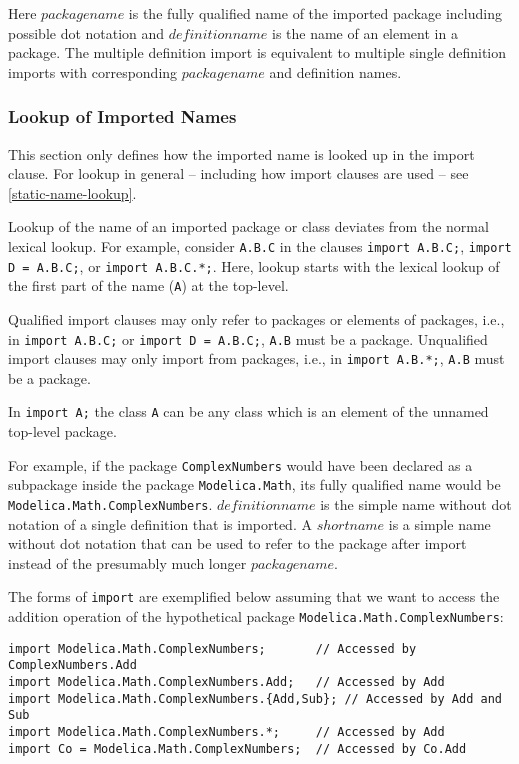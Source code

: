 Here $\mathit{packagename}$ is the fully qualified name of the imported package including possible dot notation and $\mathit{definitionname}$ is the name of an element in a package.  The multiple definition import is equivalent
to multiple single definition imports with corresponding $\mathit{packagename}$ and definition names.

\subsubsection{Lookup of Imported Names}\label{lookup-of-imported-names}

This section only defines how the imported name is looked up in the import clause. For lookup in general -- including how import clauses are used -- see \cref{static-name-lookup}.

Lookup of the name of an imported package or class deviates from the normal lexical lookup.  For example, consider \lstinline!A.B.C! in the clauses \lstinline!import A.B.C;!, \lstinline!import D = A.B.C;!, or \lstinline!import A.B.C.*;!.
Here, lookup starts with the lexical lookup of the first part of the name (\lstinline!A!) at the top-level.

Qualified import clauses may only refer to packages or elements of packages, i.e., in \lstinline!import A.B.C;! or \lstinline!import D = A.B.C;!, \lstinline!A.B! must be a package.  Unqualified import clauses may only import
from packages, i.e., in \lstinline!import A.B.*;!, \lstinline!A.B! must be a package.

\begin{nonnormative}
In \lstinline!import A;! the class \lstinline!A! can be any class which is an element of the unnamed top-level package.
\end{nonnormative}

\begin{nonnormative}
For example, if the package \lstinline!ComplexNumbers! would have been declared as a subpackage inside the package \lstinline!Modelica.Math!, its fully qualified name would be
\lstinline!Modelica.Math.ComplexNumbers!.  $\mathit{definitionname}$ is the simple name without dot notation of a single definition that is imported.  A $\mathit{shortname}$ is
a simple name without dot notation that can be used to refer to the package after import instead of the presumably much longer $\mathit{packagename}$.

The forms of \lstinline!import! are exemplified below assuming that we want to access the addition operation of the hypothetical package \lstinline!Modelica.Math.ComplexNumbers!:
\begin{lstlisting}[language=modelica]
import Modelica.Math.ComplexNumbers;       // Accessed by ComplexNumbers.Add
import Modelica.Math.ComplexNumbers.Add;   // Accessed by Add
import Modelica.Math.ComplexNumbers.{Add,Sub}; // Accessed by Add and Sub
import Modelica.Math.ComplexNumbers.*;     // Accessed by Add
import Co = Modelica.Math.ComplexNumbers;  // Accessed by Co.Add
\end{lstlisting}
\end{nonnormative}

